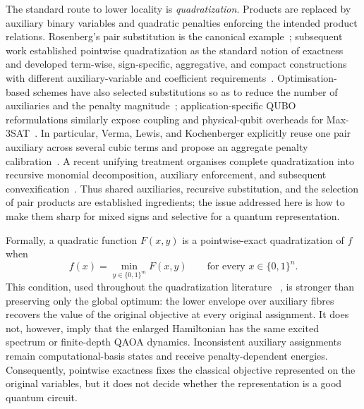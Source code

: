 \documentclass[a4paper,onecolumn,11pt,unpublished]{quantumarticle}
\theoremstyle{remark}
\begin{document}
The standard route to lower locality is \emph{quadratization}.  Products are
replaced by auxiliary binary variables and quadratic penalties enforcing the
intended product relations.  Rosenberg's pair substitution is the canonical
example~\cite{Rosenberg1975}; subsequent work established pointwise
quadratization as the standard notion of exactness and developed term-wise,
sign-specific, aggregative, and compact constructions with different
auxiliary-variable and coefficient requirements~\cite{FreedmanDrineas2005,
Ishikawa2011,BorosGruber2014,AnthonyEtAl2017,
BorosCramaRodriguezHeck2020,Dattani2019}.  Optimisation-based schemes have also
selected substitutions so as to reduce the number of auxiliaries and the
penalty magnitude~\cite{VermaLewis2020}; application-specific QUBO
reformulations similarly expose coupling and physical-qubit overheads for
Max-3SAT~\cite{Nusslein2023}.  In particular, Verma, Lewis, and
Kochenberger explicitly reuse one pair auxiliary across several cubic terms
and propose an aggregate penalty calibration~\cite{VermaLewisKochenberger2021}.
A recent unifying treatment organises complete quadratization into recursive
monomial decomposition, auxiliary enforcement, and subsequent
convexification~\cite{CramaEtAl2025}.  Thus shared auxiliaries, recursive
substitution, and the selection of pair products are established ingredients;
the issue addressed here is how to make them sharp for mixed signs and
selective for a quantum representation.

Formally, a quadratic function $F(x,y)$ is a pointwise-exact quadratization of
$f$ when
\begin{equation}
    f(x)=\min_{y\in\{0,1\}^{m}}F(x,y)
    \qquad\text{for every }x\in\{0,1\}^{n}.
    \label{eq:intro-pointwise}
\end{equation}
This condition, used throughout the quadratization literature
~\cite{BorosGruber2014,AnthonyEtAl2017,CramaEtAl2025}, is stronger than
preserving only the global optimum: the lower envelope over auxiliary fibres
recovers the value of the original objective at every original assignment.
It does not, however, imply that the enlarged Hamiltonian has the same excited
spectrum or finite-depth QAOA dynamics.  Inconsistent auxiliary assignments
remain computational-basis states and receive penalty-dependent energies.
Consequently, pointwise exactness fixes the classical objective represented on
the original variables, but it does not decide whether the representation is a
good quantum circuit.
\end{document}
